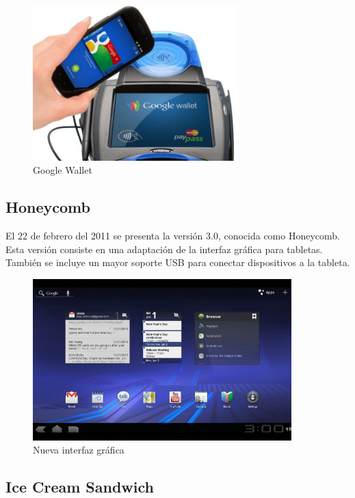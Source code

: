\begin{figure}[!h]
\centering
         \includegraphics[height=6cm]{imagenes/capitulo2/gingerbreak-wallet.jpg}
	\caption{Google Wallet}
\end{figure}

\subsection{Honeycomb}

El 22 de febrero del 2011 se presenta la versión 3.0, conocida como Honeycomb. Esta versión consiste en una adaptación de la interfaz gráfica para tabletas. También se incluye un mayor soporte USB para conectar dispositivos a la tableta.

\begin{figure}[!h]
\centering
         \includegraphics[width=10cm]{imagenes/capitulo2/honeycomb-screen.jpg}
	\caption{Nueva interfaz gráfica}
\end{figure}

\subsection{Ice Cream Sandwich}

